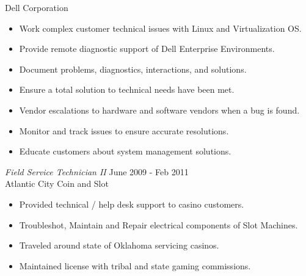 \documentclass[margin]{res}
\begin{document}
\begin{resume}
 	Dell Corporation
 	\begin{itemize}  \itemsep -2pt %
 		\item Work complex customer technical issues with Linux and Virtualization OS.
 		\item Provide remote diagnostic support of Dell Enterprise Environments.
 		\item Document problems, diagnostics, interactions, and solutions.
 		\item Ensure a total solution to technical needs have been met.
 		\item Vendor escalations to hardware and software vendors when a bug is found.
 		\item Monitor and track issues to ensure accurate resolutions.
 		\item Educate customers about system management solutions.
 	\end{itemize}
 	{\sl Field Service Technician II} \hfill June 2009 - Feb 2011 \\
 	Atlantic City Coin and Slot
 	\begin{itemize}  \itemsep -2pt %
 		\item Provided technical / help desk support to casino customers.
 		\item Troubleshot, Maintain and Repair electrical components of Slot Machines.
 		\item Traveled around state of Oklahoma servicing casinos.
 		\item Maintained license with tribal and state gaming commissions.
 	\end{itemize} 	
 	
 	
\end{resume}
\end{document}
